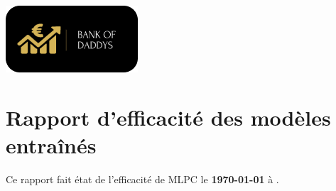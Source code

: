 \documentclass[10pt,a4paper]{article}
\begin{document}
\begin{center}
\includegraphics[scale=1]{views/img/background_splash} 
\end{center}
\section{Rapport d'efficacité des modèles entraînés }
\flushleft
\bigbreak  
\bigbreak  
Ce rapport fait état de l'efficacité de MLPC le \textbf {\today{}}  à  \textbf {\DTMcurrenttime{}}.
\bigbreak  
\bigbreak  

\end{document}
